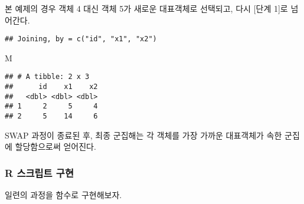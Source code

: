 \documentclass[
]{book}
\newenvironment{Shaded}{\begin{snugshade}}{\end{snugshade}}
\newcommand{\FunctionTok}[1]{\textcolor[rgb]{0.00,0.00,0.00}{#1}}
\newcommand{\NormalTok}[1]{#1}
\newcommand{\OtherTok}[1]{\textcolor[rgb]{0.56,0.35,0.01}{#1}}
\newcommand{\SpecialCharTok}[1]{\textcolor[rgb]{0.00,0.00,0.00}{#1}}
\begin{document}
본 예제의 경우 객체 4 대신 객체 5가 새로운 대표객체로 선택되고, 다시 {[}단계 1{]}로 넘어간다.

\begin{Shaded}
\end{Shaded}

\begin{verbatim}
## Joining, by = c("id", "x1", "x2")
\end{verbatim}

\begin{Shaded}
\begin{Highlighting}[]
\NormalTok{M}
\end{Highlighting}
\end{Shaded}

\begin{verbatim}
## # A tibble: 2 x 3
##      id    x1    x2
##   <dbl> <dbl> <dbl>
## 1     2     5     4
## 2     5    14     6
\end{verbatim}

SWAP 과정이 종료된 후, 최종 군집해는 각 객체를 가장 가까운 대표객체가 속한 군집에 할당함으로써 얻어진다.

\hypertarget{pam-user-defined-functions}{%
\subsubsection{R 스크립트 구현}\label{pam-user-defined-functions}}

일련의 과정을 함수로 구현해보자.
\end{document}
